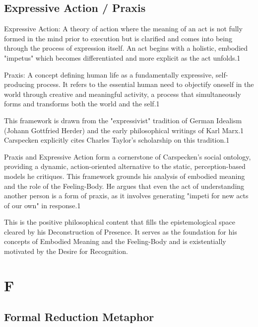 \documentclass{book}
\begin{document}
\section{Expressive Action / Praxis}

\textit{}

Expressive Action: A theory of action where the meaning of an act is not fully formed in the mind prior to execution but is clarified and comes into being through the process of expression itself. An act begins with a holistic, embodied "impetus" which becomes differentiated and more explicit as the act unfolds.1

Praxis: A concept defining human life as a fundamentally expressive, self-producing process. It refers to the essential human need to objectify oneself in the world through creative and meaningful activity, a process that simultaneously forms and transforms both the world and the self.1

This framework is drawn from the "expressivist" tradition of German Idealism (Johann Gottfried Herder) and the early philosophical writings of Karl Marx.1 Carspecken explicitly cites Charles Taylor's scholarship on this tradition.1

Praxis and Expressive Action form a cornerstone of Carspecken's social ontology, providing a dynamic, action-oriented alternative to the static, perception-based models he critiques. This framework grounds his analysis of embodied meaning and the role of the Feeling-Body. He argues that even the act of understanding another person is a form of praxis, as it involves generating "impeti for new acts of our own" in response.1

This is the positive philosophical content that fills the epistemological space cleared by his Deconstruction of Presence. It serves as the foundation for his concepts of Embodied Meaning and the Feeling-Body and is existentially motivated by the Desire for Recognition.

\parencite{Carspecken1999}

\chapter{F}

\section{Formal Reduction Metaphor}
\end{document}
